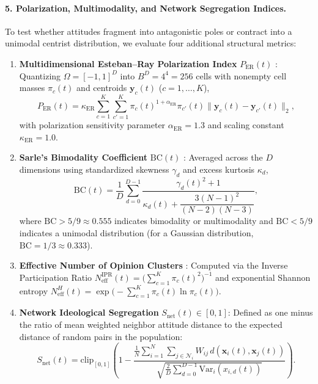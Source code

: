 \paragraph{5. Polarization, Multimodality, and Network Segregation Indices.}
To test whether attitudes fragment into antagonistic poles or contract into a unimodal centrist distribution, we evaluate four additional structural metrics:
\begin{enumerate}
    \item \textbf{Multidimensional Esteban--Ray Polarization Index} $P_{\mathrm{ER}}(t)$ \citep{esteban1994measurement}: Quantizing $\Omega = [-1, 1]^D$ into $B^D = 4^4 = 256$ cells with nonempty cell masses $\pi_c(t)$ and centroids $\mathbf{y}_c(t)$ ($c = 1, \dots, K$),
    \begin{equation}
        P_{\mathrm{ER}}(t) = \kappa_{\mathrm{ER}} \sum_{c=1}^K \sum_{c'=1}^K \pi_c(t)^{1 + \alpha_{\mathrm{ER}}} \pi_{c'}(t) \|\mathbf{y}_c(t) - \mathbf{y}_{c'}(t)\|_2,
        \label{eq:esteban_ray}
    \end{equation}
    with polarization sensitivity parameter $\alpha_{\mathrm{ER}} = 1.3$ and scaling constant $\kappa_{\mathrm{ER}} = 1.0$.
    \item \textbf{Sarle's Bimodality Coefficient} $\mathrm{BC}(t)$ \citep{pfister2013good}: Averaged across the $D$ dimensions using standardized skewness $\gamma_d$ and excess kurtosis $\kappa_d$,
    \begin{equation}
        \mathrm{BC}(t) = \frac{1}{D}\sum_{d=0}^{D-1} \frac{\gamma_d(t)^2 + 1}{\kappa_d(t) + \dfrac{3(N-1)^2}{(N-2)(N-3)}},
        \label{eq:sarle_bc}
    \end{equation}
    where $\mathrm{BC} > 5/9 \approx 0.555$ indicates bimodality or multimodality and $\mathrm{BC} < 5/9$ indicates a unimodal distribution (for a Gaussian distribution, $\mathrm{BC} = 1/3 \approx 0.333$).
    \item \textbf{Effective Number of Opinion Clusters} \citep{laakso1979effective, jost2006entropy}: Computed via the Inverse Participation Ratio $N_{\mathrm{eff}}^{\mathrm{IPR}}(t) = \big(\sum_{c=1}^K \pi_c(t)^2\big)^{-1}$ and exponential Shannon entropy $N_{\mathrm{eff}}^{H}(t) = \exp\!\big(-\sum_{c=1}^K \pi_c(t)\ln\pi_c(t)\big)$.
    \item \textbf{Network Ideological Segregation} $S_{\mathrm{net}}(t) \in [0, 1]$: Defined as one minus the ratio of mean weighted neighbor attitude distance to the expected distance of random pairs in the population:
    \begin{equation}
        S_{\mathrm{net}}(t) = \mathrm{clip}_{[0, 1]}\!\left(1 - \frac{\frac{1}{N}\sum_{i=1}^N \sum_{j \in \mathcal{N}_i} W_{ij}\, d(\mathbf{x}_i(t), \mathbf{x}_j(t))}{\sqrt{\frac{2}{D}\sum_{d=0}^{D-1} \mathrm{Var}_i(x_{i,d}(t))}}\right).
        \label{eq:network_segregation}
    \end{equation}
\end{enumerate}

